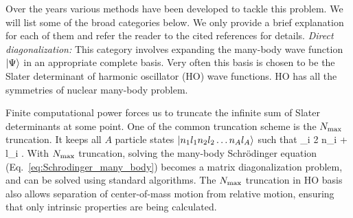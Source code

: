	Over the years various methods have been developed to tackle
  this problem.  We will list some of the broad categories below.
	We only provide
  a brief explanation for each of them and refer the reader to the cited
  references for details.
	\bi
	\li
	\emph{Direct diagonalization:}
	This category involves expanding the many-body wave function ${|\Psi\rangle}$ in
	an appropriate complete basis.  Very often this basis is chosen to be the
	Slater determinant of harmonic oscillator (HO) wave functions.
	HO has all the symmetries of nuclear many-body problem.

	Finite computational power forces us to truncate the infinite sum of
	Slater determinants at some point.  One of the common truncation scheme is
	the ${N_{\mathrm{max}}}$ truncation.  It keeps all $A$ particle states
	${|n_1 l_1 n_2 l_2 \ldots n_A l_A\rangle}$ such that
	\beq
	\sum_i 2 n_i + l_i \leq \Nmax \;.
	\eeq
	With ${N_{\mathrm{max}}}$ truncation, solving the many-body Schr\"{o}dinger equation
	(Eq.~\eqref{eq:Schrodinger_many_body}) becomes a matrix diagonalization
	problem, and can be solved using standard algorithms. The ${N_{\mathrm{max}}}$
	truncation in HO basis also allows
	separation of center-of-mass motion from relative motion, ensuring that only
	intrinsic properties are being calculated.

